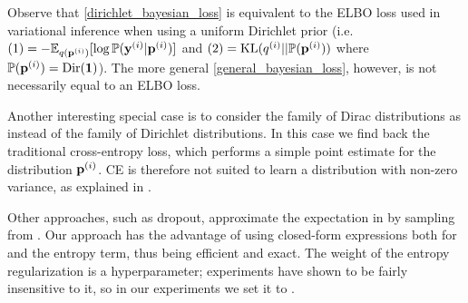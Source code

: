 Observe that \cref{dirichlet_bayesian_loss} is equivalent to the ELBO loss used in variational inference when using a uniform Dirichlet prior (i.e. $(1)=-\mathbb{E}_{q(\mathbf{p}^{(i)})}[\log \mathbb{P}(\mathbf{y}^{(i)}|\mathbf{p}^{(i)})]$ and $(2)=\text{KL}(q^{(i)}||\mathbb{P}(\mathbf{p}^{(i)}))$ where $\mathbb{P}(\mathbf{p}^{(i)}) = \text{Dir}(\mathbf{1})$). The more general \cref{general_bayesian_loss}, however, is not necessarily equal to an ELBO loss.

Another interesting special case is to consider the family of Dirac distributions as  instead of the family of Dirichlet distributions. In this case we find back the traditional cross-entropy loss, which performs a simple point estimate for the distribution $\mathbf{p}^{(i)}$. CE is therefore not suited to learn a distribution with non-zero variance, as explained in \cite{uceloss}.

Other approaches, such as dropout, approximate the expectation in \UCEacro by sampling from . Our approach has the advantage of using closed-form expressions both for \UCEacro \cite{uceloss} and the entropy term, thus being efficient and exact. The weight of the entropy regularization is a hyperparameter; experiments have shown \PostNetacro to be fairly insensitive to it, so in our experiments we set it to .
